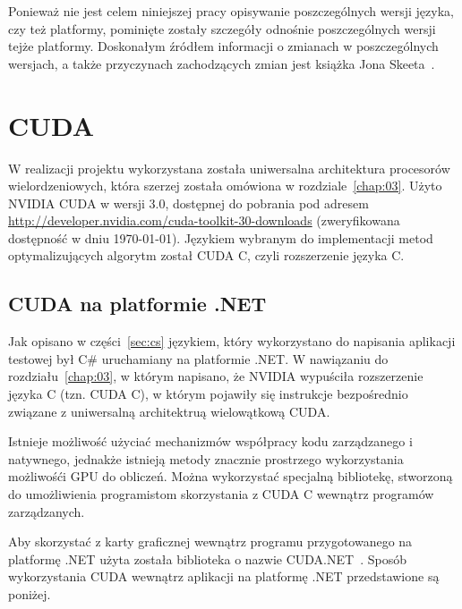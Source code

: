 Ponieważ nie jest celem niniejszej pracy opisywanie poszczególnych wersji języka, czy też platformy, pominięte zostały szczegóły odnośnie poszczególnych wersji tejże platformy. Doskonałym źródłem informacji o zmianach w poszczególnych wersjach, a także przyczynach zachodzących zmian jest książka Jona Skeeta~\cite{cSharp:inDepthS}.

\section{CUDA}
W realizacji projektu wykorzystana została uniwersalna architektura procesorów wielordzeniowych, która szerzej została omówiona w rozdziale~\ref{chap:03}. Użyto NVIDIA CUDA w wersji 3.0, dostępnej do pobrania pod adresem \url{http://developer.nvidia.com/cuda-toolkit-30-downloads} (zweryfikowana dostępność w dniu \today). Językiem wybranym do implementacji metod optymalizujących algorytm został CUDA C, czyli rozszerzenie języka C.

\subsection{CUDA na platformie .NET}
Jak opisano w części~\ref{sec:cs} językiem, który wykorzystano do napisania aplikacji testowej był C\# uruchamiany na platformie .NET. W nawiązaniu do rozdziału~\ref{chap:03}, w którym napisano, że NVIDIA wypuściła rozszerzenie języka C (tzn. CUDA C), w którym pojawiły się instrukcje bezpośrednio związane z uniwersalną architektruą wielowątkową CUDA.

Istnieje możliwość użyciać mechanizmów współpracy kodu zarządzanego i natywnego, jednakże istnieją metody znacznie prostrzego wykorzystania możliwośći GPU do obliczeń. Można wykorzystać specjalną bibliotekę, stworzoną do umożliwienia programistom skorzystania z CUDA C wewnątrz programów zarządzanych.

Aby skorzystać z karty graficznej wewnątrz programu przygotowanego na platformę .NET użyta została biblioteka o nazwie CUDA.NET~\cite{cuda:net}. Sposób wykorzystania CUDA wewnątrz aplikacji na platformę .NET przedstawione są poniżej.


